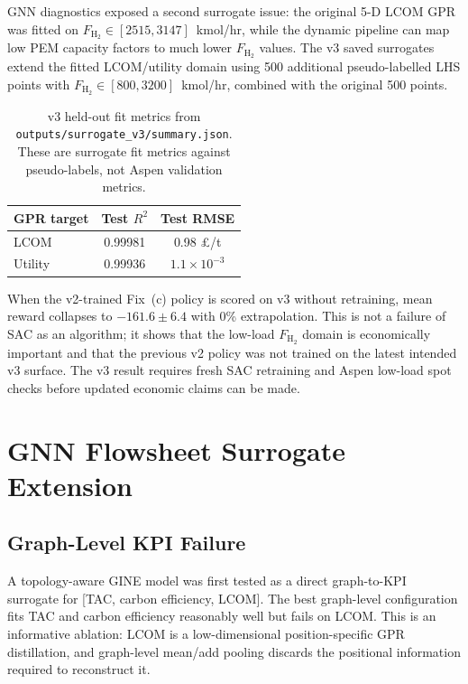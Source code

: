 \documentclass[11pt,a4paper]{article}
\begin{document}
GNN diagnostics exposed a second surrogate issue: the original 5-D LCOM GPR
was fitted on $F_{\mathrm{H}_2} \in [2515, 3147]$~kmol/hr, while the dynamic
pipeline can map low PEM capacity factors to much lower
$F_{\mathrm{H}_2}$ values. The v3 saved surrogates extend the fitted
LCOM/utility domain using 500 additional pseudo-labelled LHS points with
$F_{\mathrm{H}_2} \in [800, 3200]$~kmol/hr, combined with the original 500
points.

\begin{table}[H]
  \centering
  \caption{v3 held-out fit metrics from
           \texttt{outputs/surrogate\_v3/summary.json}. These are surrogate
           fit metrics against pseudo-labels, not Aspen validation metrics.}
  \label{tab:v3}
  \small
  \begin{tabular}{l cc}
    \toprule
    \textbf{GPR target} & \textbf{Test $R^2$} & \textbf{Test RMSE} \\
    \midrule
    LCOM                & 0.99981 & 0.98 \pounds/t \\
    Utility             & 0.99936 & $1.1 \times 10^{-3}$ \\
    \bottomrule
  \end{tabular}
\end{table}

When the v2-trained Fix~(c) policy is scored on v3 without retraining, mean
reward collapses to $-161.6 \pm 6.4$ with 0\% extrapolation. This is not a
failure of SAC as an algorithm; it shows that the low-load
$F_{\mathrm{H}_2}$ domain is economically important and that the previous v2
policy was not trained on the latest intended v3 surface. The v3 result requires
fresh SAC retraining and Aspen low-load spot checks before updated economic
claims can be made.

\section{GNN Flowsheet Surrogate Extension}

\subsection{Graph-Level KPI Failure}

A topology-aware GINE model was first tested as a direct graph-to-KPI
surrogate for [TAC, carbon efficiency, LCOM]. The best graph-level
configuration fits TAC and carbon efficiency reasonably well but fails on
LCOM. This is an informative ablation: LCOM is a low-dimensional
position-specific GPR distillation, and graph-level mean/add pooling discards
the positional information required to reconstruct it.
\end{document}
